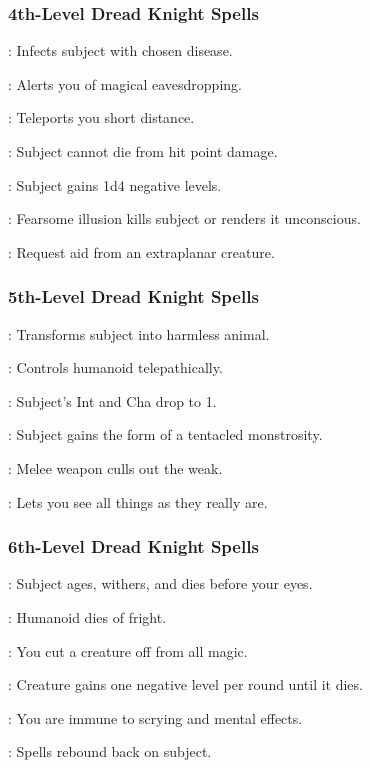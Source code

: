 \subsubsection{4th-Level Dread Knight Spells}
\begin{list}{}{\leftmargin=1em}
\item {}: Infects subject with chosen disease.
\item {}: Alerts you of magical eavesdropping.
\item {}: Teleports you short distance.
\item {}: Subject cannot die from hit point damage.
\item {}: Subject gains 1d4 negative levels.
\item {}: Fearsome illusion kills subject or renders it unconscious.
\item {}: Request aid from an extraplanar creature.
\end{list}
\subsubsection{5th-Level Dread Knight Spells}
\begin{list}{}{\leftmargin=1em}
\item {}: Transforms subject into harmless animal.
\item {}: Controls humanoid telepathically.
\item {}: Subject's Int and Cha drop to 1.
\item {}: Subject gains the form of a tentacled monstrosity.
\item {}: Melee weapon culls out the weak.
\item {}: Lets you see all things as they really are.
\end{list}
\subsubsection{6th-Level Dread Knight Spells}
\begin{list}{}{\leftmargin=1em}
\item {}: Subject ages, withers, and dies before your eyes.
\item {}: Humanoid dies of fright.
\item {}: You cut a creature off from all magic.
\item {}: Creature gains one negative level per round until it dies.
\item {}: You are immune to scrying and mental effects.
\item {}: Spells rebound back on subject.
\end{list}

